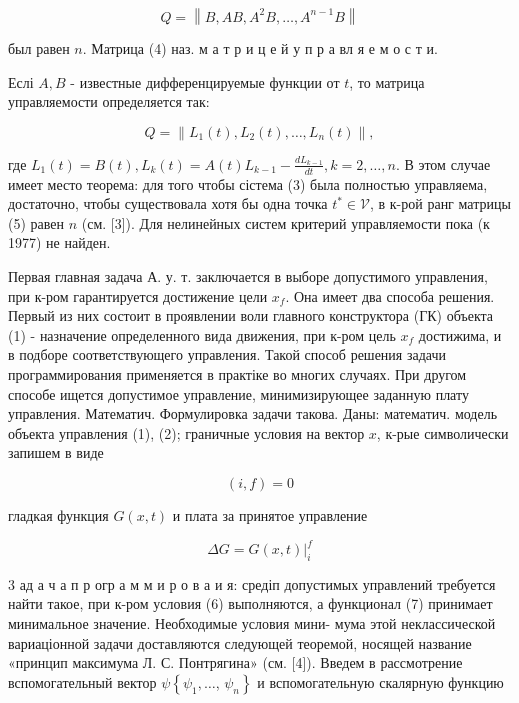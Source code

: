 \documentclass[10pt]{article}
\begin{document}
\[

Q=\left\|B, A B, A^{2} B, \ldots, A^{n-1} B\right\|

\]



был равен $n$. Матрица (4) наз. м а т р и ц е й у п р а вл я е м о с т и.



Еслі $A, B$ - известные дифференцируемые функции от $t$, то матрица управляемости определяется так:



\[

Q=\left\|L_{1}(t), L_{2}(t), \ldots, L_{n}(t)\right\|,

\]



где $L_{1}(t)=B(t), L_{k}(t)=A(t) L_{k-1}-\frac{d L_{k-1}}{d t}, k=2, \ldots, n$. В этом случае имеет место теорема: для того чтобы сістема (3) была полностью управляема, достаточно, чтобы существовала хотя бы одна точка $t^{*} \in \mathscr{V}$, в к-рой ранг матрицы (5) равен $n$ (см. [3]). Для нелинейных систем критерий управляемости пока (к 1977) не найден.



Первая главная задача А. у. т. заключается в выборе допустимого управления, при к-ром гарантируется достижение цели $x_{f}$. Она имеет два способа решения. Первый из них состоит в проявлении воли главного конструктора (ГК) объекта (1) - назначение определенного вида движения, при к-ром цель $x_{f}$ достижима, и в подборе соответствующего управления. Такой способ решения задачи программирования применяется в практіке во многих случаях. При другом способе ищется допустимое управление, минимизирующее заданную плату управления. Математич. Формулировка задачи такова. Даны: математич. модель объекта управления (1), (2); граничные условия на вектор $x$, к-рые символически запишем в виде



\[

(i, f)=0

\]



гладкая функция $G(x, t)$ и плата за принятое управление



\[

\Delta G=\left.G(x, t)\right|_{i} ^{f}

\]



3 ад а ч а п р огр а м м и р о в а и я: средіп допустимых управлений требуется найти такое, при к-ром условия (6) выполняются, а функционал (7) принимает минимальное значение. Необходимые условия мини- мума этой неклассической вариаціонной задачи доставляются следующей теоремой, носящей название «принцип максимума Л. С. Понтрягина» (см. [4]). Введем в рассмотрение вспомогательный вектор $\psi\left\{\psi_{1}, \ldots\right.$, $\left.\psi_{n}\right\}$ и вспомогательную скалярную функцию
\end{document}
